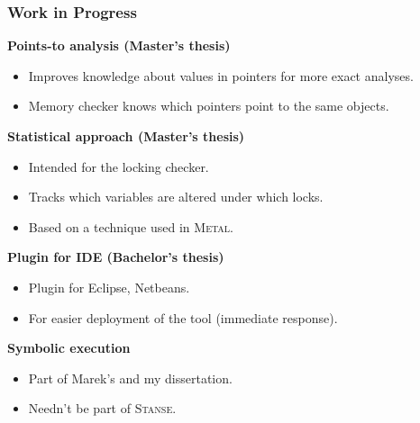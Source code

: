 \documentclass[handout,xcolor=dvipsnames]{beamer}
\newcommand{\heading}[1]{\textbf{\textcolor{BurntOrange}{#1}}}
\begin{document}
\begin{frame}
  \frametitle{Work in Progress}
  \heading{Points-to analysis (Master's thesis)}
  \begin{itemize}
  \item Improves knowledge about values in pointers for more exact analyses.
  \item Memory checker knows which pointers point to the same objects.
  \end{itemize}

  \pause
  \medskip

  \heading{Statistical approach (Master's thesis)}
  \begin{itemize}
  \item Intended for the locking checker.
  \item Tracks which variables are altered under which locks.
  \item Based on a technique used in \textsc{Metal}.
  \end{itemize}

  \pause
  \medskip

  \heading{Plugin for IDE (Bachelor's thesis)}
  \begin{itemize}
  \item Plugin for Eclipse, Netbeans.
  \item For easier deployment of the tool (immediate response).
  \end{itemize}

  \pause
  \medskip

  \heading{Symbolic execution}
  \begin{itemize}
  \item Part of Marek's and my dissertation.
  \item Needn't be part of \textsc{Stanse}.
  \end{itemize}
\end{frame}
\end{document}
